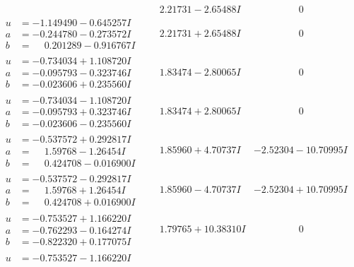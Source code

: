 \documentclass[1p]{elsarticle_modified}
\theoremstyle{definition}
\begin{document}
$$\begin{array}{c|c|c}
 & \phantom{-}2.21731 - 2.65488 I & \phantom{-0.000000 } 0 \\ \hline\begin{aligned}
u &= -1.149490 - 0.645257 I \\
a &= -0.244780 - 0.273572 I \\
b &= \phantom{-}0.201289 - 0.916767 I\end{aligned}
 & \phantom{-}2.21731 + 2.65488 I & \phantom{-0.000000 } 0 \\ \hline\begin{aligned}
u &= -0.734034 + 1.108720 I \\
a &= -0.095793 - 0.323746 I \\
b &= -0.023606 + 0.235560 I\end{aligned}
 & \phantom{-}1.83474 - 2.80065 I & \phantom{-0.000000 } 0 \\ \hline\begin{aligned}
u &= -0.734034 - 1.108720 I \\
a &= -0.095793 + 0.323746 I \\
b &= -0.023606 - 0.235560 I\end{aligned}
 & \phantom{-}1.83474 + 2.80065 I & \phantom{-0.000000 } 0 \\ \hline\begin{aligned}
u &= -0.537572 + 0.292817 I \\
a &= \phantom{-}1.59768 - 1.26454 I \\
b &= \phantom{-}0.424708 - 0.016900 I\end{aligned}
 & \phantom{-}1.85960 + 4.70737 I & -2.52304 - 10.70995 I \\ \hline\begin{aligned}
u &= -0.537572 - 0.292817 I \\
a &= \phantom{-}1.59768 + 1.26454 I \\
b &= \phantom{-}0.424708 + 0.016900 I\end{aligned}
 & \phantom{-}1.85960 - 4.70737 I & -2.52304 + 10.70995 I \\ \hline\begin{aligned}
u &= -0.753527 + 1.166220 I \\
a &= -0.762293 - 0.164274 I \\
b &= -0.822320 + 0.177075 I\end{aligned}
 & \phantom{-}1.79765 + 10.38310 I & \phantom{-0.000000 } 0 \\ \hline\begin{aligned}
u &= -0.753527 - 1.166220 I \\

\end{aligned}
\end{array}$$
\end{document}
